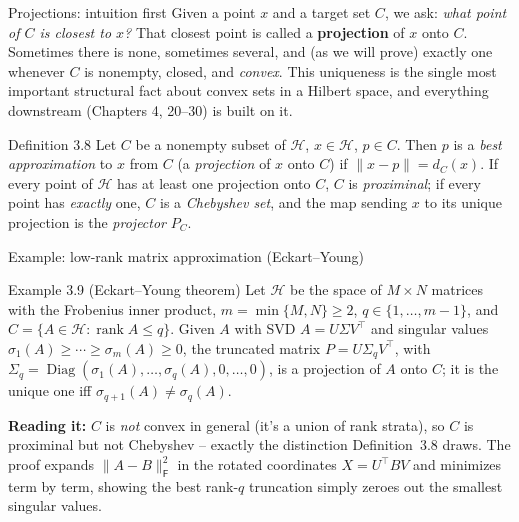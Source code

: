 \documentclass[aspectratio=169,10pt]{beamer}
\newcommand{\Hil}{\mathcal{H}}
\newcommand{\rank}{\operatorname{rank}}
\newcommand{\norm}[1]{\lVert #1 \rVert}
\newcommand{\dC}{d_C}
\newcommand{\PC}{P_C}
\begin{document}
\begin{frame}{Projections: intuition first}
  Given a point $x$ and a target set $C$, we ask: \emph{what point of $C$ is
  closest to $x$?} That closest point is called a \textbf{projection} of $x$
  onto $C$. Sometimes there is none, sometimes several, and (as we will
  prove) exactly one whenever $C$ is nonempty, closed, and \emph{convex}.
  This uniqueness is the single most important structural fact about convex
  sets in a Hilbert space, and everything downstream (Chapters 4, 20--30) is
  built on it.

  \begin{block}{Definition 3.8}
    Let $C$ be a nonempty subset of $\Hil$, $x\in\Hil$, $p\in C$. Then $p$ is
    a \emph{best approximation} to $x$ from $C$ (a \emph{projection} of $x$
    onto $C$) if $\norm{x-p} = \dC(x)$. If every point of $\Hil$ has at least
    one projection onto $C$, $C$ is \emph{proximinal}; if every point has
    \emph{exactly} one, $C$ is a \emph{Chebyshev set}, and the map sending
    $x$ to its unique projection is the \emph{projector} $\PC$.
  \end{block}
\end{frame}

\begin{frame}{Example: low-rank matrix approximation (Eckart--Young)}
  \begin{block}{Example 3.9 (Eckart--Young theorem)}
    Let $\Hil$ be the space of $M\times N$ matrices with the Frobenius inner
    product, $m=\min\{M,N\}\ge 2$, $q\in\{1,\dots,m-1\}$, and
    $C=\{A\in\Hil : \rank A \le q\}$. Given $A$ with SVD $A=U\Sigma V^{\!\top}$
    and singular values $\sigma_1(A)\ge\cdots\ge\sigma_m(A)\ge 0$, the
    truncated matrix $P = U\Sigma_q V^{\!\top}$, with
    $\Sigma_q = \operatorname{Diag}(\sigma_1(A),\dots,\sigma_q(A),0,\dots,0)$,
    is a projection of $A$ onto $C$; it is the unique one iff
    $\sigma_{q+1}(A)\ne\sigma_q(A)$.
  \end{block}
  \textbf{Reading it:} $C$ is \emph{not} convex in general (it's a union of
  rank strata), so $C$ is proximinal but not Chebyshev -- exactly the
  distinction Definition~3.8 draws. The proof expands
  $\norm{A-B}_{\mathsf F}^2$ in the rotated coordinates $X=U^{\!\top}BV$ and
  minimizes term by term, showing the best rank-$q$ truncation simply zeroes
  out the smallest singular values.
\end{frame}
\end{document}
